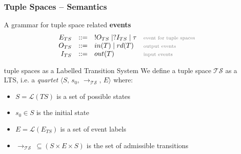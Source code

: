 \documentclass[presentation]{beamer}\mode<presentation>{\usetheme{AMSCesenaPurpleAndGold}}
\begin{document}
\begin{frame}
\frametitle{Tuple Spaces -- Semantics}

    \begin{block}{A grammar for tuple space related \textbf{events}}
        \[\begin{array}{rcll}
            E_{TS} &::=& !O_{TS} \mid ?I_{TS}  \mid \tau & \mathhint{event for tuple spaces} \\
            O_{TS} &::=& in(T) \mid rd(T) & \mathhint{output events} \\
            I_{TS} &::=& out(T) & \mathhint{input events} \\
        \end{array}\]
    \end{block}
    
    \pause

    \begin{block}{ tuple spaces as a Labelled Transition System}
        We define a tuple space $\mathcal{TS}$ as a LTS, i.e. a \emph{quartet} $ \langle S,\, s_0,\, \longrightarrow_\mathcal{TS},\, E \rangle$ where:
        \begin{itemize}
            \item $S = \mathcal{L}(TS)$ is a set of possible \alert{states}
            \item $s_0 \in S$ is the \alert{initial} state
            \item $E = \mathcal{L}(E_{TS})$ is a set of event \alert{labels}
            \item $\longrightarrow_\mathcal{TS}\ \subseteq (S \times E \times S)$ is the set of admissible \alert{transitions}
        \end{itemize}
    \end{block}
    
\end{frame}
\end{document}
